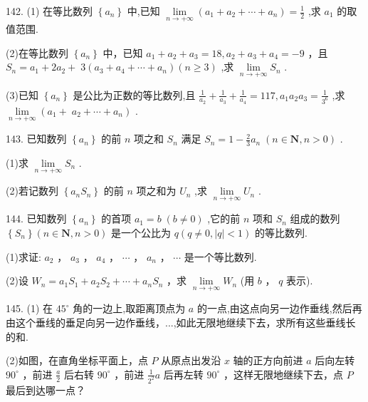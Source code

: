 \documentclass[10pt]{article}
\begin{document}
142. (1) 在等比数列 \(\left\{  {a}_{n}\right\}\) 中,已知 \(\mathop{\lim }\limits_{{n \rightarrow   + \infty }}\left( {{a}_{1} + {a}_{2} + \cdots  + {a}_{n}}\right)  = \frac{1}{2}\) ,求 \({a}_{1}\) 的取值范围.

(2)在等比数列 \(\left\{  {a}_{n}\right\}\) 中，已知 \({a}_{1} + {a}_{2} + {a}_{3} = {18},{a}_{2} + {a}_{3} + {a}_{4} =  - 9\) ，且 \({S}_{n} = {a}_{1} + 2{a}_{2} + \; 3\left( {{a}_{3} + {a}_{4} + \cdots  + {a}_{n}}\right) \left( {n \geq  3}\right)\) ,求 \(\mathop{\lim }\limits_{{n \rightarrow   + \infty }}{S}_{n}\) .

(3)已知 \(\left\{  {a}_{n}\right\}\) 是公比为正数的等比数列,且 \(\frac{1}{{a}_{2}} + \frac{1}{{a}_{3}} + \frac{1}{{a}_{4}} = {117},{a}_{1}{a}_{2}{a}_{3} = \frac{1}{{3}^{6}}\) ,求 \(\mathop{\lim }\limits_{{n \rightarrow   + \infty }}\left( {{a}_{1} + }\right. \; \left. {{a}_{2} + \cdots  + {a}_{n}}\right)\) .

143. 已知数列 \(\left\{  {a}_{n}\right\}\) 的前 \(n\) 项之和 \({S}_{n}\) 满足 \({S}_{n} = 1 - \frac{2}{3}{a}_{n}\;\left( {n \in  \mathbf{N},n > 0}\right)\) .

(1)求 \(\mathop{\lim }\limits_{{n \rightarrow   + \infty }}{S}_{n}\) .

(2)若记数列 \(\left\{  {{a}_{n}{S}_{n}}\right\}\) 的前 \(n\) 项之和为 \({U}_{n}\) ,求 \(\mathop{\lim }\limits_{{n \rightarrow   + \infty }}{U}_{n}\) .

144. 已知数列 \(\left\{  {a}_{n}\right\}\) 的首项 \({a}_{1} = b\;\left( {b \neq  0}\right)\) ,它的前 \(n\) 项和 \({S}_{n}\) 组成的数列 \(\left\{  {S}_{n}\right\}  \left( {n \in  \mathbf{N},n > 0}\right)\) 是一个公比为 \(q\left( {q \neq  0,\left| q\right|  < 1}\right)\) 的等比数列.

(1)求证: \({a}_{2}\) ， \({a}_{3}\) ， \({a}_{4}\) ， \(\cdots\) ， \({a}_{n}\) ， \(\cdots\) 是一个等比数列.

(2)设 \({W}_{n} = {a}_{1}{S}_{1} + {a}_{2}{S}_{2} + \cdots  + {a}_{n}{S}_{n}\) ，求 \(\mathop{\lim }\limits_{{n \rightarrow   + \infty }}{W}_{n}\) (用 \(b\) ， \(q\) 表示).

145. (1) 在 \({45}^{ \circ  }\) 角的一边上,取距离顶点为 \(a\) 的一点,由这点向另一边作垂线,然后再由这个垂线的垂足向另一边作垂线，...,如此无限地继续下去，求所有这些垂线长的和.

(2)如图，在直角坐标平面上，点 \(P\) 从原点出发沿 \(x\) 轴的正方向前进 \(a\) 后向左转 \({90}^{ \circ  }\) ，前进 \(\frac{a}{2}\) 后右转 \({90}^{ \circ  }\) ，前进 \(\frac{1}{{2}^{2}}a\) 后再左转 \({90}^{ \circ  }\) ，这样无限地继续下去，点 \(P\) 最后到达哪一点？
\end{document}
